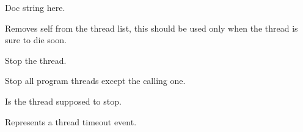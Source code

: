 \documentclass[letterpaper,10pt,english]{sphinxmanual}
\begin{document}
\begin{fulllineitems}
\label{threads:threads.diwathread.DIWA_THREAD}
Doc string here.

\begin{fulllineitems}
\label{threads:threads.diwathread.DIWA_THREAD.remove_self}
Removes self from the thread list, this should be used only when
the thread is sure to die soon.

\end{fulllineitems}


\begin{fulllineitems}
\label{threads:threads.diwathread.DIWA_THREAD.stop}
Stop the thread.

\end{fulllineitems}


\begin{fulllineitems}
\label{threads:threads.diwathread.DIWA_THREAD.stop_all}
Stop all program threads except the calling one.

\end{fulllineitems}


\begin{fulllineitems}
\label{threads:threads.diwathread.DIWA_THREAD.stop_is_set}
Is the thread supposed to stop.

\end{fulllineitems}


\end{fulllineitems}


\begin{fulllineitems}
\label{threads:threads.diwathread.TimeoutException}
Represents a thread timeout event.

\end{fulllineitems}
\end{document}
